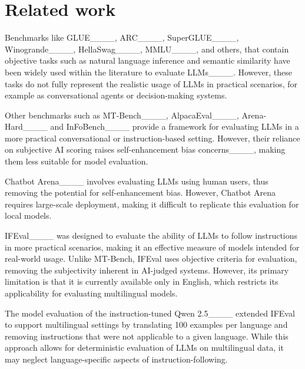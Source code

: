 \section{Related work}

Benchmarks like GLUE____, ARC____, SuperGLUE____, Winogrande____, HellaSwag____, MMLU____, and others, that contain objective tasks such as natural language inference and semantic similarity have been widely used within the literature to evaluate LLMs____. However, these tasks do not fully represent the realistic usage of LLMs in practical scenarios, for example as conversational agents or decision-making systems.

Other benchmarks such as MT-Bench____, AlpacaEval____, Arena-Hard____ and InFoBench____ provide a framework for evaluating LLMs in a more practical conversational or instruction-based setting. However, their reliance on subjective AI scoring raises self-enhancement bias concerns____, making them less suitable for model evaluation.

Chatbot Arena____ involves evaluating LLMs using human users, thus removing the potential for self-enhancement bias. However, Chatbot Arena requires large-scale deployment, making it difficult to replicate this evaluation for local models.

IFEval____ was designed to evaluate the ability of LLMs to follow instructions in more practical scenarios, making it an effective measure of models intended for real-world usage. Unlike MT-Bench, IFEval uses objective criteria for evaluation, removing the subjectivity inherent in AI-judged systems. However, its primary limitation is that it is currently available only in English, which restricts its applicability for evaluating multilingual models.


The model evaluation of the instruction-tuned Qwen 2.5____ extended IFEval to support multilingual settings by translating 100 examples per language and removing instructions that were not applicable to a given language. While this approach allows for deterministic evaluation of LLMs on multilingual data, it may neglect language-specific aspects of instruction-following.

